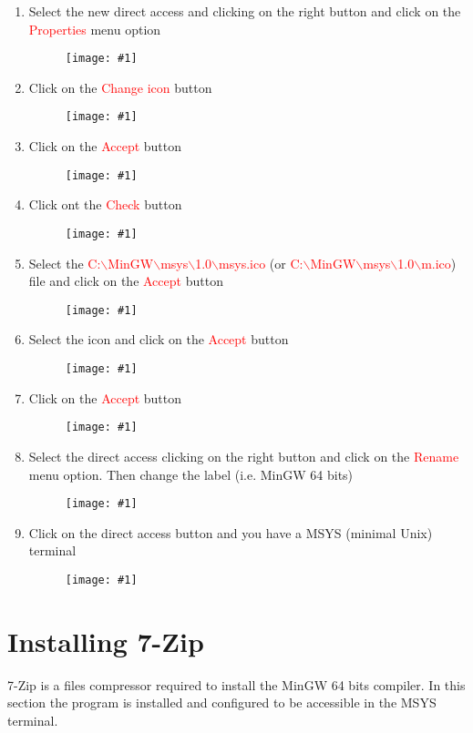\documentclass[a4paper]{article}
\newcommand{\FIGURE}[1]
{
	\begin{figure}[!ht]
	\centering
	\texttt{[image: \#1]}
	\end{figure}
}
\newcommand{\RED}[1] {\textcolor{red}{#1}}
\begin{document}
\begin{enumerate}
\item Select the new direct access and clicking on the right button and click on
the \RED{Properties} menu option
\FIGURE{msys-13.png.eps}

\clearpage

\item Click on the \RED{Change icon} button
\FIGURE{msys-14.png.eps}

\item Click on the \RED{Accept} button
\FIGURE{msys-15.png.eps}

\clearpage

\item Click ont the \RED{Check} button
\FIGURE{msys-16.png.eps}

\item Select the
\RED{C:$\backslash$MinGW$\backslash$msys$\backslash$1.0$\backslash$msys.ico} (or
\RED{C:$\backslash$MinGW$\backslash$msys$\backslash$1.0$\backslash$m.ico}) file
and click on the \RED{Accept} button
\FIGURE{msys-17.png.eps}

\clearpage

\item Select the icon and click on the \RED{Accept} button
\FIGURE{msys-18.png.eps}

\item Click on the \RED{Accept} button
\FIGURE{msys-19.png.eps}

\clearpage

\item Select the direct access clicking on the right button and click on the
\RED{Rename} menu option. Then change the label (i.e. MinGW 64 bits)
\FIGURE{msys-20.png.eps}

\item Click on the direct access button and you have a MSYS (minimal Unix)
terminal
\FIGURE{msys-21.png.eps}

\end{enumerate}

\clearpage

\section{Installing 7-Zip}

7-Zip is a files compressor required to install the MinGW 64 bits compiler. In
this section the program is installed and configured to be accessible in the
MSYS terminal.
\end{document}
